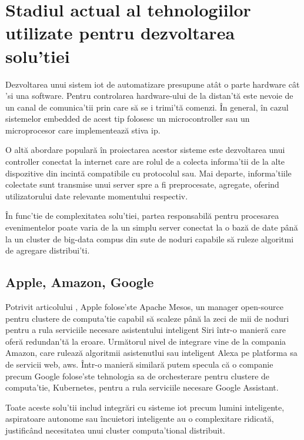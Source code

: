 \section {Stadiul actual al tehnologiilor utilizate pentru dezvoltarea solu'tiei}

Dezvoltarea unui sistem \acrshort{iot} de automatizare presupune atât o parte hardware cât 'si una software. Pentru controlarea hardware-ului de la distan'tă este nevoie de un canal de comunica'tii prin care să se i trimi'tă comenzi. În general, în cazul sistemelor embedded de acest tip folosesc un microcontroller sau un microprocesor care implementează stiva \acrshort{ip}.

O altă abordare populară în proiectarea acestor sisteme este dezvoltarea unui controller conectat la internet care are rolul de a colecta informa'tii de la alte dispozitive din incintă compatibile cu protocolul sau. Mai departe, informa'tiile colectate sunt transmise unui server spre a fi preprocesate, agregate, oferind utilizatorului date relevante momentului respectiv.

În func'tie de complexitatea solu'tiei, partea responsabilă pentru procesarea evenimentelor poate varia de la un simplu server conectat la o bază de date până la un cluster de big-data compus din sute de noduri capabile să ruleze algoritmi de agregare distribui'ti.


\subsection {Apple, Amazon, Google}

Potrivit articolului \cite{AppleRebuildsSiriMesos}, Apple folose'ste Apache Mesos, un manager open-source pentru clustere de computa'tie capabil să scaleze până la zeci de mii de noduri pentru a rula serviciile necesare asistentului inteligent Siri într-o manieră care oferă redundan'tă la eroare. Următorul nivel de integrare vine de la compania Amazon, care rulează algoritmii asistenutlui sau inteligent Alexa pe platforma sa de servicii web, \acrfull{aws}. Într-o manieră similară putem specula că o companie precum Google folose'ste tehnologia sa de orchesterare pentru clustere de computa'tie, Kubernetes, pentru a rula serviciile necesare Google Assistant.

Toate aceste solu'tii includ integrări cu sisteme \acrshort{iot} precum lumini inteligente, aspiratoare autonome sau încuietori inteligente au o complexitare ridicată, justificând necesitatea unui cluster computa'tional distribuit. 

